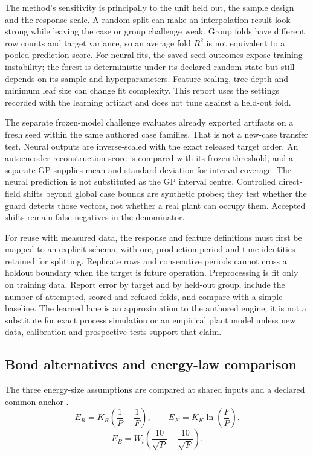 \documentclass[10pt]{article}
\begin{document}
The method's sensitivity is principally to the unit held out, the sample
design and the response scale. A random split can make an interpolation
result look strong while leaving the case or group challenge weak. Group
folds have different row counts and target variance, so an average fold
\(R^2\) is not equivalent to a pooled prediction score. For neural fits,
the saved seed outcomes expose training instability; the forest is
deterministic under its declared random state but still depends on its
sample and hyperparameters. Feature scaling, tree depth and minimum leaf
size can change fit complexity. This report uses the settings recorded
with the learning artifact and does not tune against a held-out fold.

The separate frozen-model challenge evaluates already exported artifacts
on a fresh seed within the same authored case families. That is not a
new-case transfer test. Neural outputs are inverse-scaled with the exact
released target order. An autoencoder reconstruction score is compared
with its frozen threshold, and a separate GP supplies mean and standard
deviation for interval coverage. The neural prediction is not
substituted as the GP interval centre. Controlled direct-field shifts
beyond global case bounds are synthetic probes; they test whether the
guard detects those vectors, not whether a real plant can occupy them.
Accepted shifts remain false negatives in the denominator.

For reuse with measured data, the response and feature definitions must
first be mapped to an explicit schema, with ore, production-period and time
identities retained for splitting. Replicate rows and consecutive
periods cannot cross a holdout boundary when the target is future
operation. Preprocessing is fit only on training data. Report error by
target and by held-out group, include the number of attempted, scored
and refused folds, and compare with a simple baseline. The learned lane
is an approximation to the authored engine; it is not a substitute for
exact process simulation or an empirical plant model unless new data,
calibration and prospective tests support that claim.

\subsection{Bond alternatives and energy-law
comparison}\label{bond-alternatives-and-energy-law-comparison}

\label{method-energy-laws}

The three energy-size assumptions are compared at shared inputs and a
declared common anchor \cite{bond1952,kick1885,rittinger1867,gmg2021}.
\begin{equation}
E_R=K_R\left(\frac{1}{P}-\frac{1}{F}\right),
\qquad E_K=K_K\ln\left(\frac{F}{P}\right).
\end{equation} \begin{equation}
E_B=W_i\left(\frac{10}{\sqrt{P}}-\frac{10}{\sqrt{F}}\right).
\end{equation}
\end{document}
